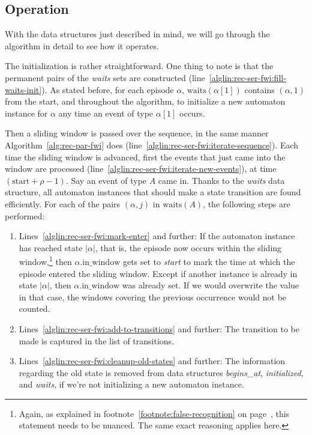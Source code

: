 \subsection{Operation}

With the data structures just described in mind, we will go through the algorithm in detail to see how it operates.

The initialization is rather straightforward. One thing to note is that the permanent pairs of the \emph{waits} sets are constructed (line~\ref{alglin:rec-ser-fwi:fill-waits-init}). As stated before, for each episode $ \alpha $, $ \text{waits}(\alpha[1]) $ contains $ (\alpha, 1) $ from the start, and throughout the algorithm, to initialize a new automaton instance for $ \alpha $ any time an event of type $ \alpha[1] $ occurs.

Then a sliding window is passed over the sequence, in the same manner Algorithm~\ref{alg:rec-par-fwi} does (line~\ref{alglin:rec-ser-fwi:iterate-sequence}). Each time the sliding window is advanced, first the events that just came into the window are processed (line~\ref{alglin:rec-ser-fwi:iterate-new-events}), at time $ (\text{start} + \rho - 1) $. Say an event of type $ A $ came in. Thanks to the \emph{waits} data structure, all automaton instances that should make a state transition are found efficiently. For each of the pairs $ (\alpha, j) $ in $ \text{waits}(A) $, the following steps are performed:

\begin{enumerate}
\item Lines~\ref{alglin:rec-ser-fwi:mark-enter} and further: If the automaton instance has reached state $ | \alpha | $, that is, the episode now occurs within the sliding window,\footnote{Again, as explained in footnote~\ref{footnote:false-recognition} on page~\pageref{footnote:false-recognition}, this statement needs to be nuanced. The same exact reasoning applies here.} then $ \alpha \text{.in\_window} $ gets set to \emph{start} to mark the time at which the episode entered the sliding window. Except if another instance is already in state $ | \alpha | $, then $ \alpha \text{.in\_window} $ was already set. If we would overwrite the value in that case, the windows covering the previous occurrence would not be counted.
\item Lines~\ref{alglin:rec-ser-fwi:add-to-transitions} and further: The transition to be made is captured in the list of transitions.
\item Lines~\ref{alglin:rec-ser-fwi:cleanup-old-states} and further: The information regarding the old state is removed from data structures \emph{begins\_at}, \emph{initialized}, and \emph{waits}, if we're not initializing a new automaton instance.
\end{enumerate}

